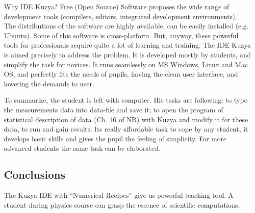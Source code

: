\documentclass[10pt, a5paper]{article}
\begin{document}
Why IDE Kuzya? Free (Open Source) Software proposes the wide range of development tools (compilers, editors, integrated development environments). The distributions of the software are highly available, can be easily installed (e.g. Ubuntu). Some of this software is cross-platform. But, anyway, these powerful tools for professionals require quite a lot of learning and training. The IDE Kuzya is aimed precisely to address the problem. It is  developed mostly by students, and simplify the task for novices. It runs seamlessly on MS Windows, Linux and Mac OS, and perfectly fits the needs of pupils, having the clean user interface, and lowering the demands to user.

To summarize, the student is left with computer. His tasks are following: to type the measurements data into data-file and save it; to open the program of statistical description of data (Ch. 16 of NR) with Kuzya and modify it for these data, to run and gain results. Its really affordable task to cope by any student, it develops basic skills and gives the pupil the feeling of simplicity. For more advanced students the same task can be elaborated. 
 
\subsection*{Conclusions}

The Kuzya IDE with ``Numerical Recipes'' give us powerful teaching tool. A student during physics course can grasp the essence of scientific computations.
\end{document}
